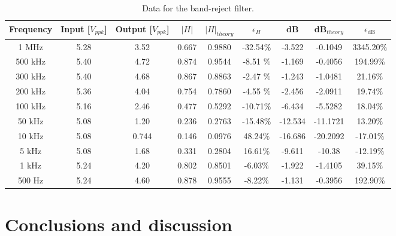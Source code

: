 \documentclass{article}
\begin{document}
\begin{table}[H]\centering
    \begin{tabular}{ccccccccc}
        \toprule
        Frequency & Input [$V_{ppk}$] & Output [$V_{ppk}$] & $|H|$  & $|H|_{theory}$ & $\epsilon_H$ & dB       & dB$_{theory}$ & $\epsilon_{\text{dB}}$ \\
        \midrule
        1 MHz     & 5.28              & 3.52  & 0.667 & 0.9880         & -32.54$\%$    & -3.522 & -0.1049       & 3345.20$\%$              \\
        500 kHz   & 5.40              & 4.72  & 0.874 & 0.9544         & -8.51 $\%$    & -1.169 & -0.4056       & 194.99$\%$              \\
        300 kHz   & 5.40              & 4.68  & 0.867 & 0.8863         & -2.47 $\%$    & -1.243 & -1.0481       & 21.16$\%$             \\
        200 kHz   & 5.36              & 4.04  & 0.754 & 0.7860         & -4.55 $\%$    & -2.456 & -2.0911       & 19.74$\%$               \\
        100 kHz   & 5.16              & 2.46  & 0.477 & 0.5292         & -10.71$\%$    & -6.434 & -5.5282       & 18.04$\%$              \\
        50 kHz    & 5.08              & 1.20  & 0.236 & 0.2763         & -15.48$\%$    & -12.534& -11.1721      & 13.20$\%$              \\
        10 kHz    & 5.08              & 0.744 & 0.146 & 0.0976         & 48.24$\%$     & -16.686& -20.2092      & -17.01$\%$             \\
        5 kHz     & 5.08              & 1.68  & 0.331 & 0.2804         & 16.61$\%$     & -9.611 & -10.38        & -12.19$\%$              \\
        1 kHz     & 5.24              & 4.20  & 0.802 & 0.8501         & -6.03$\%$     & -1.922 & -1.4105       & 39.15$\%$               \\
        500 Hz    & 5.24              & 4.60  & 0.878 & 0.9555         & -8.22$\%$     & -1.131 & -0.3956       & 192.90$\%$              \\
        \bottomrule
    \end{tabular}
    \caption{Data for the band-reject filter.}\label{TableBandreject}
\end{table}

\section{Conclusions and discussion}
\end{document}
